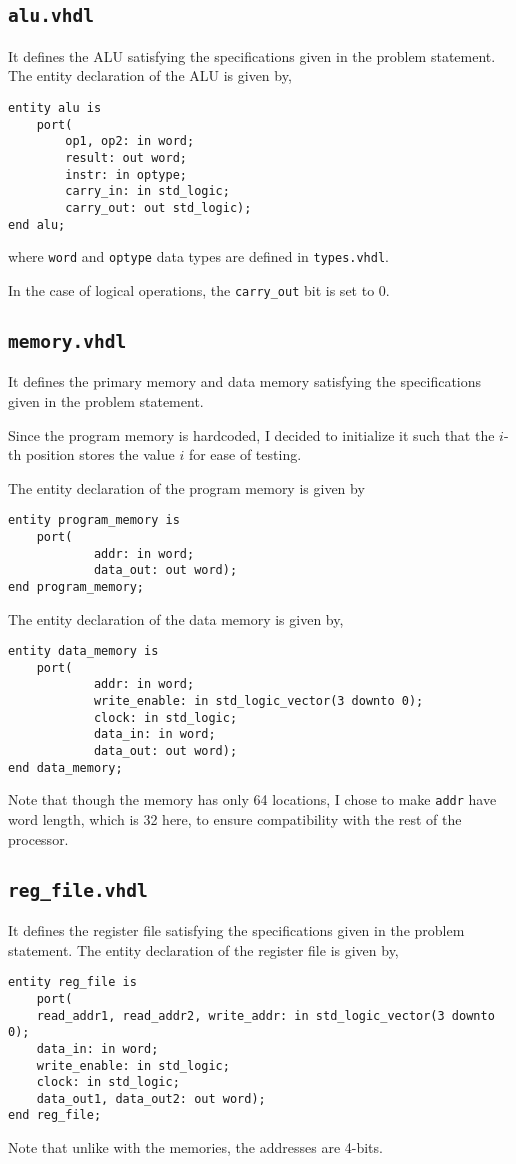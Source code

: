\documentclass[a4paper]{scrartcl}
\renewcommand{\tt}{\texttt}
\begin{document}
\subsection*{\tt{alu.vhdl}}
It defines the ALU satisfying the specifications given in the problem statement.
The entity declaration of the ALU is given by,
\begin{verbatim}
entity alu is
	port(
		op1, op2: in word;
		result: out word;
		instr: in optype;
		carry_in: in std_logic;
		carry_out: out std_logic);
end alu;
\end{verbatim}
where \tt{word} and \tt{optype} data types are defined in \tt{types.vhdl}.

In the case of logical operations, the \tt{carry_out} bit is set to $0$.

\subsection*{\tt{memory.vhdl}}
It defines the primary memory and data memory satisfying the specifications given in the problem statement.

Since the program memory is hardcoded, I decided to initialize it such that the $i$-th position stores the value $i$ for ease of testing.

The entity declaration of the program memory is given by
\begin{verbatim}
entity program_memory is
	port(
		    addr: in word;
		    data_out: out word);
end program_memory;
\end{verbatim}

The entity declaration of the data memory is given by,
\begin{verbatim}
entity data_memory is
	port(
		    addr: in word;
		    write_enable: in std_logic_vector(3 downto 0);
		    clock: in std_logic;
		    data_in: in word;
		    data_out: out word);
end data_memory;
\end{verbatim}

Note that though the memory has only 64 locations, I chose to make \tt{addr} have word length, which is 32 here, to ensure compatibility with the rest of the processor.

\subsection*{\tt{reg_file.vhdl}}
It defines the register file satisfying the specifications given in the problem statement.
The entity declaration of the register file is given by,
\begin{verbatim}
entity reg_file is
	port(
	read_addr1, read_addr2, write_addr: in std_logic_vector(3 downto 0);
	data_in: in word;
	write_enable: in std_logic;
	clock: in std_logic;
	data_out1, data_out2: out word);
end reg_file;
\end{verbatim}
Note that unlike with the memories, the addresses are 4-bits.
\end{document}
